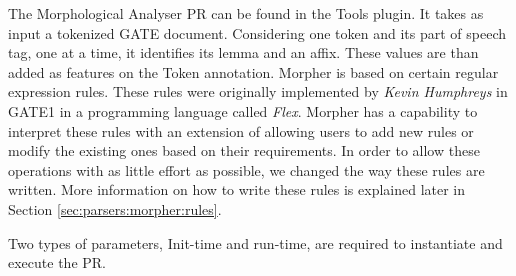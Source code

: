 The Morphological Analyser PR can be found in the Tools plugin. It
takes as input a tokenized GATE document. Considering one token and
its part of speech tag, one at a time, it identifies its lemma and an
affix. These values are than added as features on the Token
annotation. Morpher is based on certain regular expression rules.
These rules were originally implemented by \textit{Kevin Humphreys} in
GATE1 in a programming language called \textit{Flex}. Morpher has a
capability to interpret these rules with an extension of allowing
users to add new rules or modify the existing ones based on their
requirements. In order to allow these operations with as little effort
as possible, we changed the way these rules are written. More
information on how to write these rules is explained later in
Section \ref{sec:parsers:morpher:rules}.

Two types of parameters, Init-time and run-time, are required to
instantiate and execute the PR.

